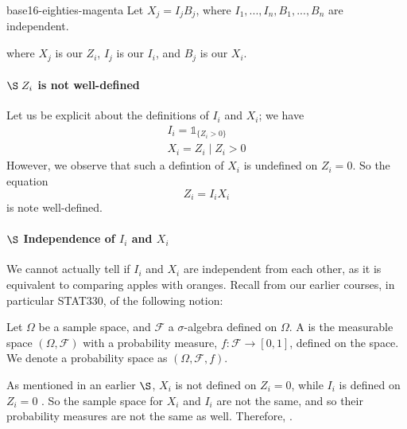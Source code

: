 \documentclass[notoc,notitlepage]{tufte-book}
\begin{document}
\begin{quotebox}{base16-eighties-magenta}
  Let $X_j = I_j B_j$, where $I_1, ..., I_n, B_1, ..., B_n$ are independent.
\end{quotebox}

where $X_j$ is our $Z_i$, $I_j$ is our $I_i$, and $B_j$ is our $X_i$.

\paragraph{$\S \; Z_i$ is not well-defined} Let us be explicit about the definitions of $I_i$ and $X_i$; we have
\begin{gather*}
  I_i = \mathbb{1}_{\{ Z_i > 0 \}} \\
  X_i = Z_i \mid Z_i > 0
\end{gather*}
However, we observe that such a defintion of $X_i$ is undefined on $Z_i = 0$. So the equation
\begin{equation*}
  Z_i = I_i X_i
\end{equation*}
is note well-defined.

\paragraph{$\S$ Independence of $I_i$ and $X_i$} We cannot actually tell if $I_i$ and $X_i$ are independent from each other, as it is equivalent to comparing apples with oranges. Recall from our earlier courses, in particular STAT330, of the following notion:

\begin{defnnonum}
\label{defn:probability_space}
  Let $\Omega$ be a sample space, and $\mathcal{F}$ a $\sigma$-algebra defined on $\Omega$. A  is the measurable space $(\Omega, \mathcal{F})$ with a \textcolor{base16-eighties-blue}{probability measure}, $f: \mathcal{F} \to [0, 1]$, defined on the space. We denote a probability space as $(\Omega, \mathcal{F}, f)$.
\end{defnnonum}

As mentioned in an earlier $\S$, $X_i$ is not defined on $Z_i = 0$, while $I_i$ is defined on $Z_i = 0$ . So the sample space for $X_i$ and $I_i$ are not the same, and so their probability measures are not the same as well. Therefore, .
\end{document}
